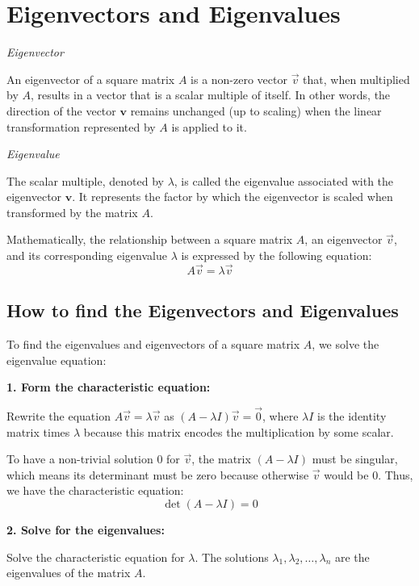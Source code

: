 \newpage
\section{Eigenvectors and Eigenvalues}

\emph{Eigenvector}

An eigenvector of a square matrix \(A\) is a non-zero vector \(\vec{v}\) that, when multiplied by \(A\), results in a vector that is a scalar multiple of itself. In other words, the direction of the vector \(\mathbf{v}\) remains unchanged (up to scaling) when the linear transformation represented by \(A\) is applied to it.

\emph{Eigenvalue}

The scalar multiple, denoted by \(\lambda\), is called the eigenvalue associated with the eigenvector \(\mathbf{v}\). It represents the factor by which the eigenvector is scaled when transformed by the matrix \(A\).

Mathematically, the relationship between a square matrix \(A\), an eigenvector \(\vec{v}\), and its corresponding eigenvalue \(\lambda\) is expressed by the following equation:
\[
A\vec{v} = \lambda\vec{v}
\]

\subsection{How to find the Eigenvectors and Eigenvalues}

To find the eigenvalues and eigenvectors of a square matrix \(A\), we solve the eigenvalue equation:

\vspace{\baselineskip}
\textbf{1. Form the characteristic equation:}

    Rewrite the equation \(A\vec{v} = \lambda\vec{v}\) as 
    \((A - \lambda I)\vec{v} = \vec{0}\), where \(\lambda I\) is the identity matrix times \(\lambda\) because 
    this matrix encodes the multiplication by some scalar. 
    
    To have a non-trivial solution \(0\) for \(\vec{v}\), the matrix \((A - \lambda I)\) must be 
    singular, which means its determinant must be zero because otherwise \(\vec{v}\) would be 0. Thus, 
    we have the characteristic equation:
    \[
    \det(A - \lambda I) = 0
    \]

\textbf{2. Solve for the eigenvalues:}

Solve the characteristic equation for \(\lambda\). The solutions \(\lambda_1, \lambda_2, \dots, \lambda_n\) 
are the eigenvalues of the matrix \(A\).
\vspace{\baselineskip}


